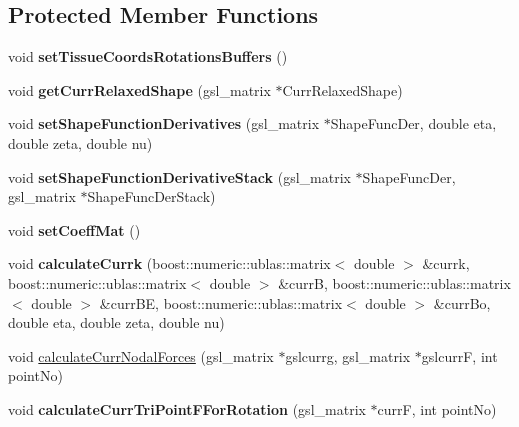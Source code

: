 \subsection*{Protected Member Functions}
\begin{DoxyCompactItemize}
\item 
\hypertarget{classPrism_a39d403ac6ffb6b56d5b2d07f8e9463a4}{}void {\bfseries set\+Tissue\+Coords\+Rotations\+Buffers} ()\label{classPrism_a39d403ac6ffb6b56d5b2d07f8e9463a4}

\item 
\hypertarget{classPrism_a3c252dc104a1ca7208b23c72737cd916}{}void {\bfseries get\+Curr\+Relaxed\+Shape} (gsl\+\_\+matrix $\ast$Curr\+Relaxed\+Shape)\label{classPrism_a3c252dc104a1ca7208b23c72737cd916}

\item 
\hypertarget{classPrism_aa1a4d3411d1f3dc05816ec01dcfa8310}{}void {\bfseries set\+Shape\+Function\+Derivatives} (gsl\+\_\+matrix $\ast$Shape\+Func\+Der, double eta, double zeta, double nu)\label{classPrism_aa1a4d3411d1f3dc05816ec01dcfa8310}

\item 
\hypertarget{classPrism_aa1f76f3cabdd00eb057f41cebbaa466d}{}void {\bfseries set\+Shape\+Function\+Derivative\+Stack} (gsl\+\_\+matrix $\ast$Shape\+Func\+Der, gsl\+\_\+matrix $\ast$Shape\+Func\+Der\+Stack)\label{classPrism_aa1f76f3cabdd00eb057f41cebbaa466d}

\item 
\hypertarget{classPrism_a0575442613f8b7d9428c58cef19ab219}{}void {\bfseries set\+Coeff\+Mat} ()\label{classPrism_a0575442613f8b7d9428c58cef19ab219}

\item 
\hypertarget{classPrism_aa433244f86cdf23a611a1adc3391c3f0}{}void {\bfseries calculate\+Currk} (boost\+::numeric\+::ublas\+::matrix$<$ double $>$ \&currk, boost\+::numeric\+::ublas\+::matrix$<$ double $>$ \&curr\+B, boost\+::numeric\+::ublas\+::matrix$<$ double $>$ \&curr\+B\+E, boost\+::numeric\+::ublas\+::matrix$<$ double $>$ \&curr\+Bo, double eta, double zeta, double nu)\label{classPrism_aa433244f86cdf23a611a1adc3391c3f0}

\item 
void \hyperlink{classPrism_aea47379b3064d866f93508a9337d8f12}{calculate\+Curr\+Nodal\+Forces} (gsl\+\_\+matrix $\ast$gslcurrg, gsl\+\_\+matrix $\ast$gslcurr\+F, int point\+No)
\item 
\hypertarget{classPrism_ae9403142a217a005a4d588a6e472be27}{}void {\bfseries calculate\+Curr\+Tri\+Point\+F\+For\+Rotation} (gsl\+\_\+matrix $\ast$curr\+F, int point\+No)\label{classPrism_ae9403142a217a005a4d588a6e472be27}


\end{DoxyCompactItemize}
